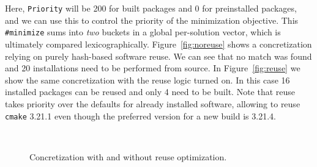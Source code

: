 Here, {\tt Priority} will be 200 for built packages and 0 for preinstalled packages, and
we can use this to control the priority of the minimization objective. This {\tt
  \#minimize} sums into {\it two} buckets in a global per-solution vector, which is
ultimately compared lexicographically.
%
%
Figure~\ref{fig:noreuse} shows a concretization relying on purely hash-based software
reuse. We can see that no match was found and 20 installations need to be performed from
source. In Figure~\ref{fig:reuse} we show the same concretization with the reuse logic
turned on. In this case 16 installed packages can be reused and only 4 need to be built.
Note that reuse takes priority over the defaults for already installed software,
allowing \spack{} to reuse \texttt{cmake} 3.21.1 even though the preferred version for a
new build is 3.21.4.

\begin{figure}[h]
  \centering
  \\
  \caption{Concretization with and without reuse optimization.}

\end{figure}


